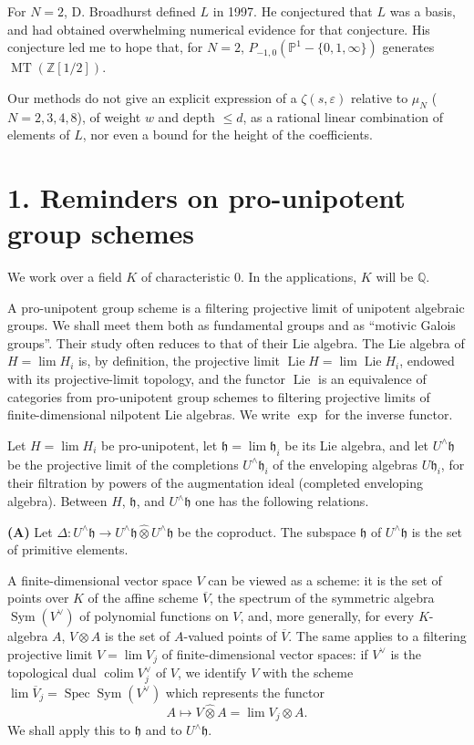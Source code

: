 \documentclass[10pt,a4paper]{article}
\newcommand{\Q}{\mathbb Q}
\newcommand{\Z}{\mathbb Z}
\newcommand{\Pone}{\mathbb P^1}
\newcommand{\Spec}{\operatorname{Spec}}
\newcommand{\Sym}{\operatorname{Sym}}
\newcommand{\Lie}{\operatorname{Lie}}
\newcommand{\MT}{\operatorname{MT}}
\newcommand{\h}{\mathfrak h}
\newcommand{\widehattensor}{\mathbin{\widehat\otimes}}
\newcommand{\Uhat}{U^{\wedge}}
\newcommand{\colim}{\operatorname*{colim}}
\theoremstyle{deligne}
\newcommand{\heading}[1]{\vspace{0.65em}\noindent{\bfseries #1}\quad}
\begin{document}
For \(N=2\), D. Broadhurst defined \(L\) in 1997. He conjectured that \(L\) was a basis, and had obtained overwhelming numerical evidence for that conjecture. His conjecture led me to hope that, for \(N=2\), \(P_{-1,0}(\Pone-\{0,1,\infty\})\) generates \(\MT(\Z[1/2])\).

Our methods do not give an explicit expression of a \(\zeta(s,\varepsilon)\) relative to \(\mu_N\) (\(N=2,3,4,8\)), of weight \(w\) and depth \(\le d\), as a rational linear combination of elements of \(L\), nor even a bound for the height of the coefficients.

\section*{1. Reminders on pro-unipotent group schemes}

We work over a field \(K\) of characteristic \(0\). In the applications, \(K\) will be \(\Q\).

\heading{1.1.} A pro-unipotent group scheme is a filtering projective limit of unipotent algebraic groups. We shall meet them both as fundamental groups and as ``motivic Galois groups''. Their study often reduces to that of their Lie algebra. The Lie algebra of \(H=\lim H_i\) is, by definition, the projective limit \(\Lie H=\lim \Lie H_i\), endowed with its projective-limit topology, and the functor \(\Lie\) is an equivalence of categories from pro-unipotent group schemes to filtering projective limits of finite-dimensional nilpotent Lie algebras. We write \(\exp\) for the inverse functor.

\heading{1.2 (cf. [1] A.1 to A.9).} Let \(H=\lim H_i\) be pro-unipotent, let \(\h=\lim \h_i\) be its Lie algebra, and let \(\Uhat\h\) be the projective limit of the completions \(\Uhat\h_i\) of the enveloping algebras \(U\h_i\), for their filtration by powers of the augmentation ideal (completed enveloping algebra). Between \(H\), \(\h\), and \(\Uhat\h\) one has the following relations.

\textbf{(A)} Let \(\Delta:\Uhat\h\to \Uhat\h\widehattensor\Uhat\h\) be the coproduct. The subspace \(\h\) of \(\Uhat\h\) is the set of primitive elements.

A finite-dimensional vector space \(V\) can be viewed as a scheme: it is the set of points over \(K\) of the affine scheme \(\overline V\), the spectrum of the symmetric algebra \(\Sym(V^\vee)\) of polynomial functions on \(V\), and, more generally, for every \(K\)-algebra \(A\), \(V\otimes A\) is the set of \(A\)-valued points of \(\overline V\). The same applies to a filtering projective limit \(V=\lim V_j\) of finite-dimensional vector spaces: if \(V^\vee\) is the topological dual \(\colim V_j^\vee\) of \(V\), we identify \(V\) with the scheme \(\lim \overline V_j=\Spec\Sym(V^\vee)\) which represents the functor
\[
A\longmapsto V\widehattensor A=\lim V_j\otimes A.
\]
We shall apply this to \(\h\) and to \(\Uhat\h\).
\end{document}
